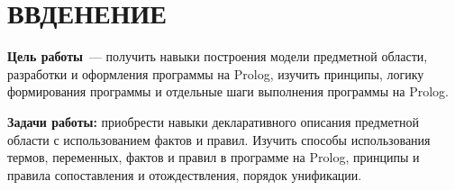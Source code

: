 \chapter*{\hfill{}ВВДЕНЕНИЕ\hfill}

\textbf{Цель работы}~--- получить навыки построения модели предметной области, разработки и оформления программы на Prolog, изучить принципы, логику формирования программы и отдельные шаги выполнения программы на Prolog.

\textbf{Задачи работы:} приобрести навыки декларативного описания предметной области с использованием фактов и правил. Изучить способы использования термов, переменных, фактов и правил в программе на Prolog, принципы и правила сопоставления и отождествления, порядок унификации.

